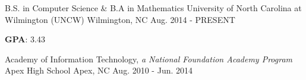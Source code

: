 

\begin{cventries}

  \cventry
    {B.S. in Computer Science \& B.A in Mathematics} %
    {University of North Carolina at Wilmington (UNCW)} %
    {Wilmington, NC} %
    {Aug. 2014 - PRESENT} %
    {
      \begin{cvitems}
        \item {\textbf{GPA}: 3.43}
      \end{cvitems}
    }
    
  \cventry
    {Academy of Information Technology, \textit{a National Foundation Academy Program}}
    {Apex High School}
    {Apex, NC}
    {Aug. 2010 - Jun. 2014}
    {
    }

\end{cventries}
